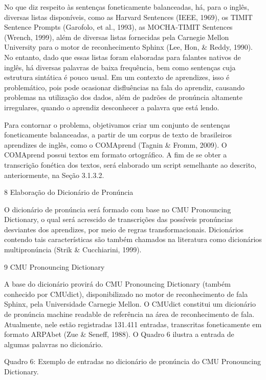 No que diz respeito às senten\c{c}as foneticamente balanceadas, h\'a, para o
ingl\^es, diversas listas dispon\'iveis, como as Harvard Sentences (IEEE,
1969), os TIMIT Sentence Prompts (Garofolo, et al., 1993), as
MOCHA-TIMIT Sentences (Wrench, 1999), al\'em de diversas listas fornecidas
pela Carnegie Mellon University para o motor de reconhecimento Sphinx
(Lee, Hon, \& Reddy, 1990). No entanto, dado que essas listas foram
elaboradas para falantes nativos de ingl\^es, h\'a diversas palavras de
baixa frequ\^encia, bem como senten\c{c}as cuja estrutura sint\'atica \'e pouco
usual. Em um contexto de aprendizes, isso \'e problem\'atico, pois pode
ocasionar disflu\^encias na fala do aprendiz, causando problemas na
utiliza\c{c}\~ao dos dados, al\'em de padr\~oes de pron\'uncia altamente
irregulares, quando o aprendiz desconhecer a palavra que est\'a lendo.

Para contornar o problema, objetivamos criar um conjunto de senten\c{c}as
foneticamente balanceadas, a partir de um corpus de texto de brasileiros
aprendizes de ingl\^es, como o COMAprend (Tagnin \& Fromm, 2009). O
COMAprend possui textos em formato ortogr\'afico. A fim de se obter a
transcri\c{c}\~ao fon\'etica dos textos, ser\'a elaborado um script semelhante ao
descrito, anteriormente, na Se\c{c}\~ao 3.1.3.2.

8 Elabora\c{c}\~ao do Dicion\'ario de Pron\'uncia

O dicion\'ario de pron\'uncia ser\'a formado com base no CMU Pronouncing
Dictionary, o qual ser\'a acrescido de transcri\c{c}\~oes das poss\'iveis
pron\'uncias desviantes dos aprendizes, por meio de regras
transformacionais. Dicion\'arios contendo tais caracter\'isticas s\~ao tamb\'em
chamados na literatura como dicion\'arios multipron\'uncia (Strik \&
Cucchiarini, 1999).

9 CMU Pronouncing Dictionary

A base do dicion\'ario provir\'a do CMU Pronouncing Dictionary (tamb\'em
conhecido por CMUdict), disponibilizado no motor de reconhecimento de
fala Sphinx, pela Universidade Carnegie Mellon. O CMUdict constitui um
dicion\'ario de pron\'uncia machine readable de refer\^encia na \'area de
reconhecimento de fala. Atualmente, nele est\~ao registradas 131.411
entradas, transcritas foneticamente em formato ARPAbet (Zue \& Seneff,
1988). O Quadro 6 ilustra a entrada de algumas palavras no dicion\'ario.

Quadro 6: Exemplo de entradas no dicion\'ario de pron\'uncia do CMU
Pronouncing Dictionary.

